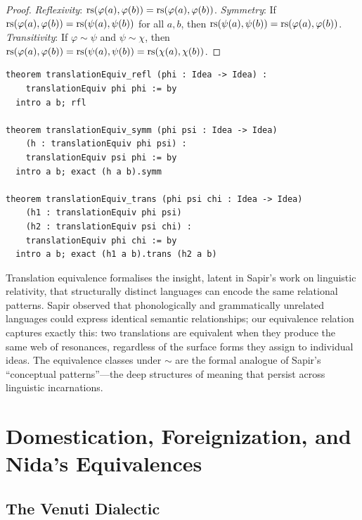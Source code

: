 \begin{proof}
\emph{Reflexivity}: $\mathrm{rs}(\varphi(a), \varphi(b)) = \mathrm{rs}(\varphi(a), \varphi(b))$.
\emph{Symmetry}: If $\mathrm{rs}(\varphi(a), \varphi(b)) = \mathrm{rs}(\psi(a), \psi(b))$
for all $a,b$, then $\mathrm{rs}(\psi(a), \psi(b)) = \mathrm{rs}(\varphi(a), \varphi(b))$.
\emph{Transitivity}: If $\varphi \sim \psi$ and $\psi \sim \chi$, then
$\mathrm{rs}(\varphi(a), \varphi(b)) = \mathrm{rs}(\psi(a), \psi(b)) = \mathrm{rs}(\chi(a), \chi(b))$.
\end{proof}

\begin{lstlisting}
theorem translationEquiv_refl (phi : Idea -> Idea) :
    translationEquiv phi phi := by
  intro a b; rfl

theorem translationEquiv_symm (phi psi : Idea -> Idea)
    (h : translationEquiv phi psi) :
    translationEquiv psi phi := by
  intro a b; exact (h a b).symm

theorem translationEquiv_trans (phi psi chi : Idea -> Idea)
    (h1 : translationEquiv phi psi)
    (h2 : translationEquiv psi chi) :
    translationEquiv phi chi := by
  intro a b; exact (h1 a b).trans (h2 a b)
\end{lstlisting}

\begin{interpretation}
\label{int:equiv-sapir}
Translation equivalence formalises the insight, latent in Sapir's work on
linguistic relativity, that structurally distinct languages can encode the
same relational patterns.  Sapir observed that phonologically and
grammatically unrelated languages could express identical semantic
relationships; our equivalence relation captures exactly this: two
translations are equivalent when they produce the same web of resonances,
regardless of the surface forms they assign to individual ideas.
The equivalence classes under $\sim$ are the formal analogue of Sapir's
``conceptual patterns''---the deep structures of meaning that persist
across linguistic incarnations.
\end{interpretation}

\section{Domestication, Foreignization, and Nida's Equivalences}
\label{sec:translation:domestication}

\subsection{The Venuti Dialectic}

